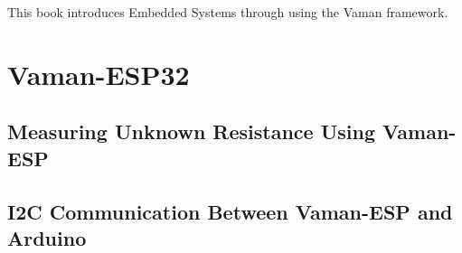 \documentclass[11pt]{book}
\begin{document}

\setcounter{page}{1}

\begin{introduction}
This book introduces Embedded Systems through using the Vaman framework.
\end{introduction}

\mainmatter
\chapter{Vaman-ESP32}

\section{Measuring Unknown Resistance Using Vaman-ESP}

\section{I2C Communication Between Vaman-ESP and Arduino}

\end{document}

